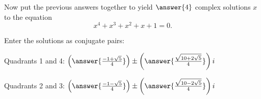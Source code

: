 \documentclass[space,nooutcomes]{ximera}
\begin{document}
\begin{problem}
Now put the previous answers together to yield $\answer{4}$ complex solutions $x$ to the equation
\[
x^4+x^3+x^2+x+1=0.
\]

Enter the solutions as conjugate pairs: 

Quadrants 1 and 4: $\left(\answer{\frac{-1+\sqrt{5}}{4}}\right) 
     \pm \left(\answer{\frac{\sqrt{10+2\sqrt{5}}}{4}}\right)i$

Quadrants 2 and 3: $\left(\answer{\frac{-1-\sqrt{5}}{4}}\right)
     \pm \left(\answer{\frac{\sqrt{10-2\sqrt{5}}}{4}}\right)i$ 



\end{problem}
\end{document}
